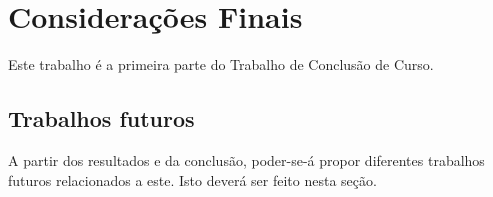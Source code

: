 %
%

\chapter{Considerações Finais}
\label{chap:consideracoes-finais}

Este trabalho é a primeira parte do Trabalho de Conclusão de Curso.

\section{Trabalhos futuros}
\label{sec:consideracoes-finais-trabalhos-futuros}

A partir dos resultados e da conclusão, poder-se-á propor diferentes trabalhos futuros relacionados a este. Isto deverá ser feito nesta seção.
